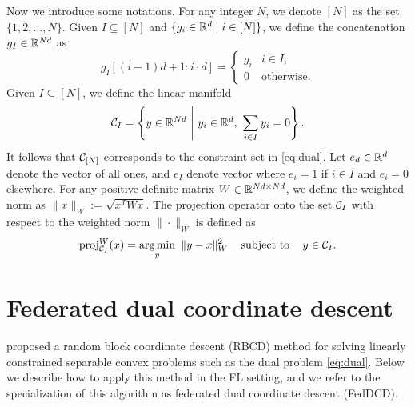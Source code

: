 Now we introduce some notations. For any integer $N$, we denote $[N]$ as the set $\{1,2,\ldots, N\}$. Given $I \subseteq [N]$ and $\{g_i \in \mathbb{R}^d \mid i \in [N]\}$, we define the concatenation $g_I \in \mathbb{R}^{Nd}$ as 
\[
    g_{I}[(i-1)d + 1 : i\cdot d] = 
    \begin{cases} 
      g_i & i \in I ;\\
      0 & \mbox{otherwise} .
    \end{cases}
\]
Given $I \subseteq [N]$, we define the linear manifold 
\[
    \mathcal{C}_I= \left\{y \in\mathbb{R}^{Nd} ~\Bigg|~ y_i\in\mathbb{R}^d, ~\sum_{i\in I}y_i = 0\right\}.
\]
It follows that $\mathcal{C}_{[N]}$ corresponds to the constraint set in \autoref{eq:dual}. Let $e_d \in \mathbb{R}^d$ denote the vector of all ones, and $e_I$ denote vector where $e_i = 1$ if $i \in I$ and $e_i = 0$ elsewhere.  For any positive definite matrix $W\in\mathbb{R}^{Nd\times Nd}$, we define the weighted norm as $\|x\|_W := \sqrt{x^TWx}$. The projection operator onto the set $\mathcal{C}_I$ with respect to the weighted norm $\|\cdot\|_W$ is defined as
\[
    \operatorname{proj}_{\mathcal{C}_I}^{W}(x) = \underset{y}{\textrm{arg}\,{\min}}\enskip \|y-x\|_W^2 \enspace\enspace\mathop{\hbox{\rm subject to}}\enspace\enspace y \in \mathcal{C}_I.
\]


\section{Federated dual coordinate descent}
\label{sec:FedDCD}

\citet{necoara2017random} proposed a random block coordinate descent (RBCD) method for solving linearly constrained separable convex problems such as the dual problem \eqref{eq:dual}. Below we describe how to apply this method in the FL setting, and we refer to the specialization of this algorithm as federated dual coordinate descent (FedDCD).

